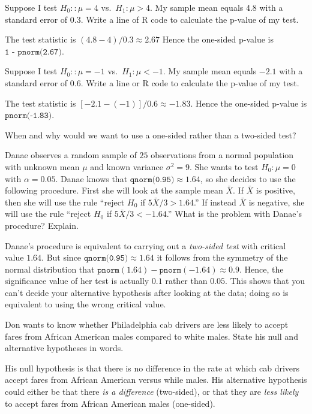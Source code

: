 \documentclass[addpoints,12pt]{exam}
\begin{document}
\begin{questions}
\question Suppose I test $H_0\colon: \mu = 4$ vs.\ $H_1\colon \mu > 4$.
My sample mean equals 4.8 with a standard error of 0.3. Write a line of R code to calculate the p-value of my test.
\begin{solution}
  The test statistic is $(4.8 - 4)/0.3 \approx 2.67$
  Hence the one-sided p-value is $\texttt{1 - pnorm(2.67)}$.
\end{solution}

\question Suppose I test $H_0\colon: \mu = -1$ vs.\ $H_1\colon \mu<-1$. My sample mean equals $-2.1$ with a standard error of $0.6$. Write a line or R code to calculate the p-value of my test.
\begin{solution}
  The test statistic is $[-2.1 - (-1)]/0.6 \approx -1.83$.
  Hence the one-sided p-value is $\texttt{pnorm(-1.83)}$.
\end{solution}

\question When and why would we want to use a one-sided rather than a two-sided test?

\question Danae observes a random sample of $25$ observations from a normal population with unknown mean $\mu$ and known variance $\sigma^2 = 9$. She wants to test $H_0\colon \mu=0$ with $\alpha = 0.05$. Danae knows that $\texttt{qnorm(0.95)} \approx 1.64$, so she decides to use the following procedure.
First she will look at the sample mean $\bar{X}$.
If $\bar{X}$ is positive, then she will use the rule ``reject $H_0$ if $5\bar{X}/3 > 1.64$.''
If instead  $\bar{X}$ is negative, she will use the rule ``reject $H_0$ if $5\bar{X}/3 < -1.64$.''
What is the problem with Danae's procedure? Explain.
\begin{solution}
  Danae's procedure is equivalent to carrying out a \emph{two-sided test} with critical value $1.64$.
  But since $\texttt{qnorm(0.95)} \approx 1.64$ it follows from the symmetry of the normal distribution that $\texttt{pnorm}(1.64) - \texttt{pnorm}(-1.64) \approx 0.9$.
  Hence, the significance value of her test is actually $0.1$ rather than $0.05$.
  This shows that you can't decide your alternative hypothesis after looking at the data; doing so is equivalent to using the wrong critical value.
\end{solution}


\question Don wants to know whether Philadelphia cab drivers are less likely to accept fares from African American males compared to white males. State his null and alternative hypotheses in words.
\begin{solution}
 His null hypothesis is that there is no difference in the rate at which cab drivers accept fares from African American versus while males.
 His alternative hypothesis could either be that there \emph{is a difference} (two-sided), or that they are \emph{less likely} to accept fares from African American males (one-sided).
\end{solution}



\end{questions}
\end{document}
